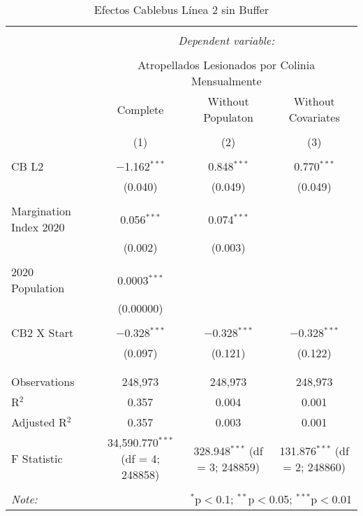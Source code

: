 
\begin{table}[!htbp] \centering 
  \caption{Efectos Cablebus Línea 2 sin Buffer} 
  \label{} 
\begin{tabular}{@{\extracolsep{5pt}}lccc} 
\\[-1.8ex]\hline 
\hline \\[-1.8ex] 
 & \multicolumn{3}{c}{\textit{Dependent variable:}} \\ 
\cline{2-4} 
\\[-1.8ex] & \multicolumn{3}{c}{Atropellados Lesionados por Colinia Mensualmente} \\ 
 & Complete & Without Populaton & Without Covariates \\ 
\\[-1.8ex] & (1) & (2) & (3)\\ 
\hline \\[-1.8ex] 
 CB L2 & $-$1.162$^{***}$ & 0.848$^{***}$ & 0.770$^{***}$ \\ 
  & (0.040) & (0.049) & (0.049) \\ 
  & & & \\ 
 Margination Index 2020 & 0.056$^{***}$ & 0.074$^{***}$ &  \\ 
  & (0.002) & (0.003) &  \\ 
  & & & \\ 
 2020 Population & 0.0003$^{***}$ &  &  \\ 
  & (0.00000) &  &  \\ 
  & & & \\ 
 CB2 X Start & $-$0.328$^{***}$ & $-$0.328$^{***}$ & $-$0.328$^{***}$ \\ 
  & (0.097) & (0.121) & (0.122) \\ 
  & & & \\ 
\hline \\[-1.8ex] 
Observations & 248,973 & 248,973 & 248,973 \\ 
R$^{2}$ & 0.357 & 0.004 & 0.001 \\ 
Adjusted R$^{2}$ & 0.357 & 0.003 & 0.001 \\ 
F Statistic & 34,590.770$^{***}$ (df = 4; 248858) & 328.948$^{***}$ (df = 3; 248859) & 131.876$^{***}$ (df = 2; 248860) \\ 
\hline 
\hline \\[-1.8ex] 
\textit{Note:}  & \multicolumn{3}{r}{$^{*}$p$<$0.1; $^{**}$p$<$0.05; $^{***}$p$<$0.01} \\ 
\end{tabular} 
\end{table} 
